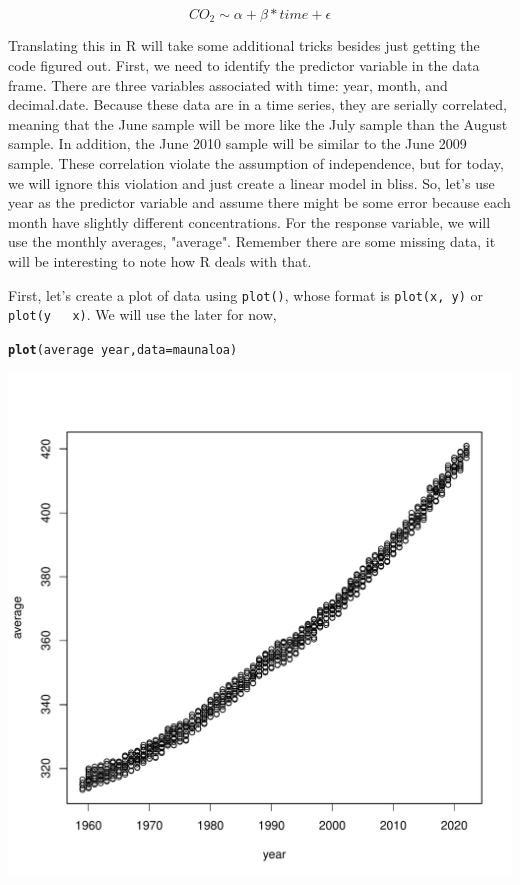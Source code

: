 \documentclass{tufte-handout}\usepackage[]{graphicx}\usepackage[]{color}
\makeatletter
\def\maxwidth{ %
  \ifdim\Gin@nat@width>\linewidth
    \linewidth
  \else
    \Gin@nat@width
  \fi
}
\newcommand{\hlopt}[1]{\textcolor[rgb]{0,0,0}{#1}}%
\newcommand{\hlstd}[1]{\textcolor[rgb]{0.345,0.345,0.345}{#1}}%
\newcommand{\hlkwc}[1]{\textcolor[rgb]{0.333,0.667,0.333}{#1}}%
\newcommand{\hlkwd}[1]{\textcolor[rgb]{0.737,0.353,0.396}{\textbf{#1}}}%
\newenvironment{kframe}{%
 \def\at@end@of@kframe{}%
 \ifinner\ifhmode%
  \def\at@end@of@kframe{\end{minipage}}%
  \begin{minipage}{\columnwidth}%
 \fi\fi%
 \def\FrameCommand##1{\hskip\@totalleftmargin \hskip-\fboxsep
 \colorbox{shadecolor}{##1}\hskip-\fboxsep
     \hskip-\linewidth \hskip-\@totalleftmargin \hskip\columnwidth}%
 \MakeFramed {\advance\hsize-\width
   \@totalleftmargin\z@ \linewidth\hsize
   \@setminipage}}%
 {\par\unskip\endMakeFramed%
 \at@end@of@kframe}
\newenvironment{knitrout}{}{} %
\makeatother
\begin{document}
\begin{equation}
CO_2 \sim \alpha + \beta * time + \epsilon
\end{equation}

Translating this in R will take some additional tricks besides just getting the code figured out. First, we need to identify the predictor variable in the data frame. There are three variables associated with time: year, month, and decimal.date. Because these data are in a time series, they are serially correlated, meaning that the June sample will be more like the July sample than the August sample. In addition, the June 2010 sample will be similar to the June 2009 sample. These correlation violate the assumption of independence, but for today, we will ignore this violation and just create a linear model in bliss. So, let's use year as the predictor variable and assume there might be some error because each month have slightly different concentrations. For the response variable, we will use the monthly averages, "average". Remember there are some missing data, it will be interesting to note how R deals with that.

First, let's create a plot of data using \texttt{plot()}, whose format is \texttt{plot(x, y)} or \texttt{plot(y ~ x)}. We will use the later for now, 

\begin{knitrout}
\color{fgcolor}\begin{kframe}
\begin{alltt}
\hlkwd{plot}\hlstd{(average} \hlopt{~} \hlstd{year,} \hlkwc{data}\hlstd{=maunaloa)}
\end{alltt}
\end{kframe}
\includegraphics[width=\maxwidth]{figure/unnamed-chunk-51-1} 
\end{knitrout}
\end{document}
